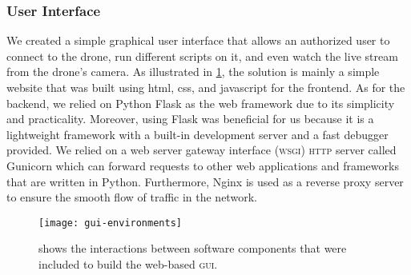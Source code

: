 \documentclass[../main.tex]{subfiles}
\begin{document}
\subsubsection{User Interface}

We created a simple graphical user interface that allows an authorized user 
to connect to the drone, run different scripts on it, and even watch the live 
stream from the drone's camera. 
As illustrated in \cref{fig:gui-environments}, the solution is mainly a simple 
website that was built using html, css, and javascript for the frontend. As 
for the backend, we relied on Python Flask as the web framework due to 
its simplicity and practicality. Moreover, using Flask was beneficial for us 
because it is a lightweight framework with a built-in development server and a 
fast debugger provided. 
We relied on a web server gateway interface (\textsc{wsgi}) \textsc{http} 
server called Gunicorn which can forward requests to other web applications 
and frameworks that are written in Python.
Furthermore, Nginx is used as a reverse proxy server to ensure the smooth flow 
of traffic in the network. 
\begin{figure}[tbp] 
	\centering
	\texttt{[image: gui-environments]} 
	\caption{shows the interactions between software components that were included to 
		build the web-based \textsc{gui}.}
	\label{fig:gui-environments}  
\end{figure}
\end{document}
